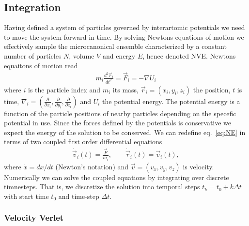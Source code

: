 \subsection{Integration}

Having defined a system of particles governed by interartomic potentials we need
to move the system forward in time. By solving Newtons equations of motion we
effectively sample the microcanonical ensemble characterized by a
constant number of particles $N$, volume $V$ and energy $E$, hence denoted NVE.
Newtons equaitons of motion read
\begin{align}
  m_i \frac{d^2 \vec{r}_i}{dt^2} = \vec{F}_i = -\nabla U_i
  \label{eq:NE}
\end{align}
where $i$ is the particle index and $m_i$ its mass, $\vec{r}_i = (x_i, y_i,
z_i)$ the position, $t$ is time,  $\nabla_i = (\frac{\partial}{\partial x_i},
\frac{\partial}{\partial y_i}, \frac{\partial}{\partial z_i})$ and $U_i$ the
potential energy. The potential energy is a function of the particle
positions of nearby particles depending on the specefic potential in use. Since
the forces defined by the potentials is conservative we expect the energy of the
solution to be conserved. We can redefine eq.~\eqref{eq:NE} in terms of two coupled
first order differential equations 
\begin{align}
  \dot{\vec{v}}_i(t) = \frac{\vec{F}}{m_i}, \qquad \dot{\vec{r}}_i(t) = \vec{v}_i(t),
  \label{eq:NE_2}
\end{align}
where $\dot{x} = dx/dt$ (Newton's notation) and $\vec{v} = (v_x, v_y, v_z)$ is
velocity. Numerically we can solve the coupled equations by
integrating over discrete timnesteps. That is, we discretize the solution into
temporal steps $t_k = t_0 + k\Delta t$ with start time $t_0$ and time-step $\Delta t$. 



\subsubsection{Velocity Verlet}

